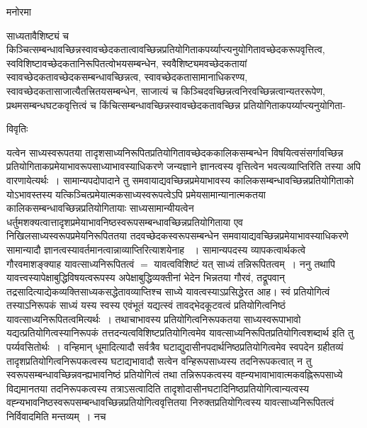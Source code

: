 \documentclass[10pt, openany]{book}
\begin{document}
{\begin{center}   मनोरमा  \end{center}

साध्यतावैशिष्ट्यं च किञ्चित्सम्बन्धावच्छिन्नस्वावच्छेदकतात्वावच्छिन्नप्रतियोगिताकपर्य्याप्त्यनुयोगितावच्छेदकरूपवृत्तित्व, स्वविशिष्टावच्छेदकतानिरूपितत्वोभयसम्बन्धेन,
स्ववैशिष्ट्यमवच्छेदकतायां स्वावच्छेदकतावच्छेदकसम्बन्धावच्छिन्नत्व, स्वावच्छेदकतासामानाधिकरण्य, स्वावच्छेदकतासाजात्यैतत्त्रितयसम्बन्धेन, साजात्यं च
किञ्चिदवच्छिन्नत्वनिरवच्छिन्नत्वान्यतररूपेण, प्रथमसम्बन्धघटकवृत्तित्वं च किंचित्सम्बन्धावच्छिन्नस्वावच्छेदकतावच्छिन्न प्रतियोगिताकपर्य्याप्त्यनुयोगिता-

\newpage
\begin{center}     विवृतिः \end{center}
यत्वेन साध्यस्वरूपतया तादृशसाध्यनिरूपितप्रतियोगितावच्छेदककालिकसम्बन्धेन विषयित्वसंसर्गावच्छिन्न प्रतियोगिताकप्रमेयाभावरूपसाध्याभावस्याधिकरणे
जन्यज्ञाने ज्ञानत्वस्य वृत्तित्वेन भवत्यव्याप्तिरिति तस्या अपि वारणायेत्यर्थः~। सामान्यपदोपादाने तु समवायाद्यवच्छिन्नप्रमेयाभावस्य कालिकसम्बन्धावच्छिन्नप्रतियोगिताको योऽभावस्तस्य यत्किञ्चित्प्रमेयात्मकसाध्यस्वरूपत्वेऽपि प्रमेयसामान्यानात्मकतया कालिकसम्बन्धावच्छिन्नप्रतियोगितायाः साध्यसामान्यीयत्वेन
धर्तुमशक्यत्वात्तादृशप्रमेयाभावनिष्ठस्वरूपसम्बन्धावच्छिन्नप्रतियोगिताया एव निखिलसाध्यस्वरूपप्रमेयनिरूपिततया तदवच्छेदकस्वरूपसम्बन्धेन समवायाद्यवच्छिन्नप्रमेयाभावस्याधिकरणे सामान्यादौ ज्ञानत्वस्यावर्तमानत्वान्नाव्याप्तिरित्याशयेनाह ~। सामान्यपदस्य व्यापकत्वार्थकत्वे
गौरवमाशङ्क्याह यावत्साध्यनिरूपितत्वं $=$ यावत्वविशिष्टं यत् साध्यं तन्निरूपितत्वम्~। ननु तथापि यावत्त्वस्यापेक्षाबुद्धिविषयत्वरूपस्य
अपेक्षाबुद्धिव्यक्तीनां भेदेन भिन्नतया गौरवं, तद्रूपवान् तद्रसादित्याद्येकव्यक्तिसाध्यकसद्धेतावव्याप्तिश्च साध्ये यावत्वस्याऽप्रसिद्धेरत आह। स्वं
प्रतियोगित्वं तस्याऽनिरूपकं साध्यं यस्य स्वस्य एवंभूतं यद्यत्स्वं तावद्भेदकूटवत्वं प्रतियोगित्वनिष्ठं यावत्साध्यनिरूपितत्वमित्यर्थः~। तथाचाभावस्य
प्रतियोगित्वनिरूपकतया साध्यस्वरूपाभावो यद्यत्प्रतियोगित्वस्यानिरूपकं तत्तदन्यत्वविशिष्टप्रतियोगित्वमेव यावत्साध्यनिरूपितप्रतियोगित्वशब्दार्थ इति तु पर्य्यवसितोर्थः~। वन्हिमान् धूमादित्यादौ सर्वत्रैव घटाद्युदासीनपदार्थनिष्ठप्रतियोगित्वमेव स्वपदेन ग्रहीतव्यं तादृशप्रतियोगित्वनिरूपकत्वस्य घटाद्यभावादौ सत्वेन वन्हिरूपसाध्यस्य तदनिरूपकत्वात् न तु स्वरूपसम्बन्धावच्छिन्नवन्ह्यभावनिष्ठं प्रतियोगित्वं तथा तन्निरूपकत्वस्य वह्न्यभावाभावात्मकवह्निरूपसाध्ये विद्यमानतया तदनिरूपकत्वस्य तत्राऽसत्वादिति तादृशोदासीनघटादिनिष्ठप्रतियोगित्वान्यत्वस्य वह्न्यभावनिष्ठस्वरूपसम्बन्धावच्छिन्नप्रतियोगित्ववृत्तितया निरुक्तप्रतियोगित्वस्य यावत्साध्यनिरूपितत्वं निर्विवादमिति मन्तव्यम्~। नच
}
\end{document}
